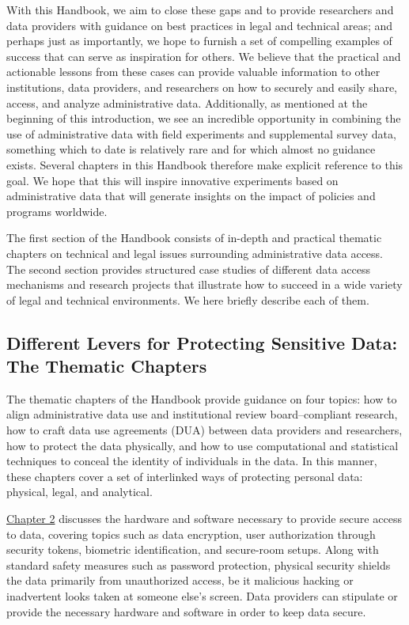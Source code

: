 With this Handbook, we aim to close these gaps and to provide researchers and data providers with guidance on best practices in legal and technical areas; and perhaps just as importantly, we hope to furnish a set of compelling examples of success that can serve as inspiration for others. We believe that the practical and actionable lessons from these cases can provide valuable information to other institutions, data providers, and researchers on how to securely and easily share, access, and analyze administrative data. Additionally, as mentioned at the beginning of this introduction, we see an incredible opportunity in combining the use of administrative data with field experiments and supplemental survey data, something which to date is relatively rare and for which almost no guidance exists. Several chapters in this Handbook therefore make explicit reference to this goal. We hope that this will inspire innovative experiments based on administrative data that will generate insights on the impact of policies and programs worldwide.

The first section of the Handbook consists of in-depth and practical thematic chapters on technical and legal issues surrounding administrative data access. The second section provides structured case studies of different data access mechanisms and research projects that illustrate how to succeed in a wide variety of legal and technical environments. We here briefly describe each of them.

\hypertarget{different-levers-for-protecting-sensitive-data-the-thematic-chapters}{%
\subsection{Different Levers for Protecting Sensitive Data: The Thematic Chapters}\label{different-levers-for-protecting-sensitive-data-the-thematic-chapters}}

The thematic chapters of the Handbook provide guidance on four topics: how to align administrative data use and institutional review board--compliant research, how to craft data use agreements (DUA) between data providers and researchers, how to protect the data physically, and how to use computational and statistical techniques to conceal the identity of individuals in the data. In this manner, these chapters cover a set of interlinked ways of protecting personal data: physical, legal, and analytical.

\protect\hyperlink{security}{Chapter 2} discusses the hardware and software necessary to provide secure access to data, covering topics such as data encryption, user authorization through security tokens, biometric identification, and secure-room setups. Along with standard safety measures such as password protection, physical security shields the data primarily from unauthorized access, be it malicious hacking or inadvertent looks taken at someone else's screen. Data providers can stipulate or provide the necessary hardware and software in order to keep data secure.

